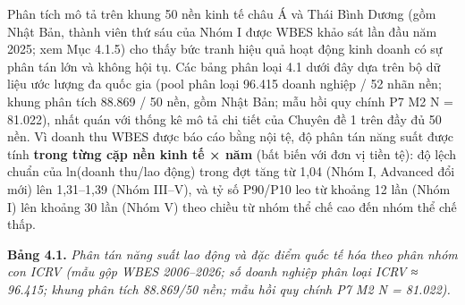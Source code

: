 \documentclass[
  a4paper,
  13pt]{extreport}
\begin{document}
Phân tích mô tả trên khung 50 nền kinh tế châu Á và Thái Bình Dương (gồm
Nhật Bản, thành viên thứ sáu của Nhóm I được WBES khảo sát lần đầu năm
2025; xem Mục 4.1.5) cho thấy bức tranh hiệu quả hoạt động kinh doanh có
sự phân tán lớn và không hội tụ. Các bảng phân loại 4.1 dưới đây dựa
trên bộ dữ liệu ước lượng đa quốc gia (pool phân loại 96.415 doanh
nghiệp / 52 nhãn nền; khung phân tích 88.869 / 50 nền, gồm Nhật Bản; mẫu
hồi quy chính P7 M2 N = 81.022), nhất quán với thống kê mô tả chi tiết
của Chuyên đề 1 trên đầy đủ 50 nền. Vì doanh thu WBES được báo cáo bằng
nội tệ, độ phân tán năng suất được tính \textbf{trong từng cặp nền kinh
tế × năm} (bất biến với đơn vị tiền tệ): độ lệch chuẩn của ln(doanh
thu/lao động) trong đợt tăng từ 1,04 (Nhóm I, Advanced đổi mới) lên
1,31--1,39 (Nhóm III--V), và tỷ số P90/P10 leo từ khoảng 12 lần (Nhóm I)
lên khoảng 30 lần (Nhóm V) theo chiều từ nhóm thể chế cao đến nhóm thể
chế thấp.

\textbf{Bảng 4.1.} \emph{Phân tán năng suất lao động và đặc điểm quốc tế
hóa theo phân nhóm con ICRV (mẫu gộp WBES 2006--2026; số doanh nghiệp
phân loại ICRV ≈ 96.415; khung phân tích 88.869/50 nền; mẫu hồi quy
chính P7 M2 N = 81.022).}
\end{document}
